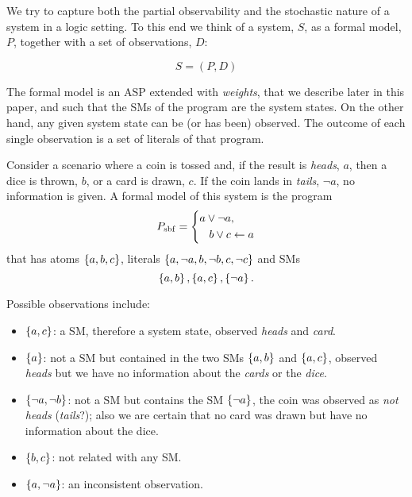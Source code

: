 \documentclass[x11names]{article}
\begin{document}
We try to capture both the partial observability and the stochastic nature of a system in a logic setting. To this end we think of a system, $S$, as a formal model, $P$, together with a set of observations, $D$:

\begin{equation}\label{eq:def.system}
    S = \left( P, D \right)
\end{equation}

The formal model is an \acl{ASP} extended with \emph{weights}, that we describe later in this paper, and such that the \aclp{SM} of the program are the system states. On the other hand, any given system state can be (or has been) observed. The outcome of each single observation is a set of literals of that program.

\begin{example}
    Consider a scenario where a coin is tossed and, if the result is \emph{heads}, \(a\), then a dice is thrown, \(b\), or a card is drawn, \(c\). If the coin lands in \emph{tails}, \(\neg a\), no information is given. A formal model of this system is the program  
    \begin{equation}\label{eq:derived.fruitful}
        P_{\sbf} = \left\lbrace\begin{aligned}
            a \vee \neg{a}  & ,          %
            \\
            b \vee c        & \clause a
        \end{aligned}
        \right.
    \end{equation}
    that has atoms \(\set{a, b, c}\), literals \(\set{a, \neg a, b, \neg b, c, \neg c}\) and \aclp{SM}
    \begin{equation}
        \set{a, b}, \set{a, c}, \set{\neg a}.
    \end{equation}
    
    Possible observations include:
    \begin{itemize}
        \item \(\set{a,c}\): a \ac{SM}, therefore a system state, observed \emph{heads} and \emph{card}.
        \item \(\set{a}\): not a \ac{SM} but contained in the two \acp{SM} $\set{a, b}$ and $\set{a, c}$, observed \emph{heads} but we have no information about the \emph{cards} or the \emph{dice}.
        \item \(\set{\neg a, \neg b}\): not a \ac{SM} but contains the \ac{SM} $\set{\neg a}$, the coin was observed as \emph{not heads} (\emph{tails}?); also we are certain that no card was drawn but have no information about the dice.
        \item \(\set{b,c}\): not related with any \ac{SM}.
        \item \(\set{a,\neg a}\): an inconsistent observation.
    \end{itemize}    
\end{example}
\end{document}
